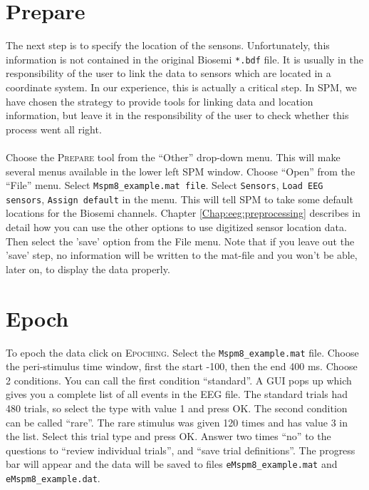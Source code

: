 \section{Prepare}
The next step is to specify the location of the sensons. Unfortunately, this information is not contained in the original Biosemi \texttt{*.bdf} file. It is usually in the responsibility of the user to link the data to sensors which are located in a coordinate system. In our experience, this is actually a critical step. In SPM, we have chosen the strategy to provide tools for linking data and location information, but leave it in the responsibility of the user to check whether this process went all right.
\\
\\
Choose the \textsc{Prepare} tool from the ``Other'' drop-down menu. This will make several menus available in the lower left SPM window. Choose ``Open'' from the ``File'' menu. Select \texttt{Mspm8\_example.mat file}. Select \texttt{Sensors}, \texttt{Load EEG sensors}, \texttt{Assign default} in the menu. This will tell SPM to take some default locations for the Biosemi channels. Chapter \ref{Chap:eeg:preprocessing} describes in detail how you can use the other options to use digitized sensor location data. Then select the 'save' option from the File menu. Note that if you leave out the 'save' step, no information will be written to the mat-file and you won't be able, later on, to display the data properly.

\section{Epoch}
To epoch the data click on \textsc{Epoching}. Select the \texttt{Mspm8\_example.mat} file. Choose the peri-stimulus time window, first the start -100, then the end 400 ms. Choose 2 conditions. You can call the first condition ``standard''. A GUI pops up which gives you a complete list of all events in the EEG file. The standard trials had 480 trials, so select the type with value 1 and press OK. The second condition can be called ``rare''. The rare stimulus was given 120 times and has value 3 in the list. Select this trial type and press OK. Answer two times ``no'' to the questions to ``review individual trials'', and ``save trial definitions''. The progress bar will appear and the data will be saved to files \texttt{eMspm8\_example.mat} and \texttt{eMspm8\_example.dat}.

